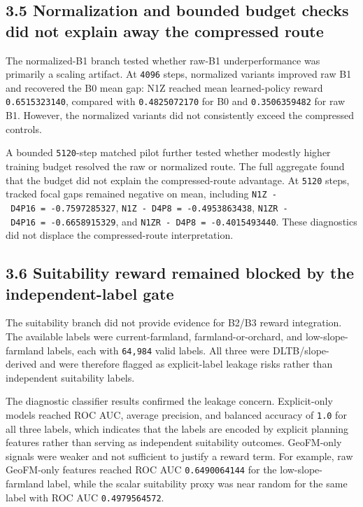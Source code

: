 \documentclass[
  11pt,
  a4paper,
]{article}
\begin{document}
\subsection{3.5 Normalization and bounded budget checks did not explain
away the compressed
route}\label{normalization-and-bounded-budget-checks-did-not-explain-away-the-compressed-route}

The normalized-B1 branch tested whether raw-B1 underperformance was
primarily a scaling artifact. At \texttt{4096} steps, normalized
variants improved raw B1 and recovered the B0 mean gap: N1Z reached mean
learned-policy reward \texttt{0.6515323140}, compared with
\texttt{0.4825072170} for B0 and \texttt{0.3506359482} for raw B1.
However, the normalized variants did not consistently exceed the
compressed controls.

A bounded \texttt{5120}-step matched pilot further tested whether
modestly higher training budget resolved the raw or normalized route.
The full aggregate found that the budget did not explain the
compressed-route advantage. At \texttt{5120} steps, tracked focal gaps
remained negative on mean, including
\texttt{N1Z\ -\ D4P16\ =\ -0.7597285327},
\texttt{N1Z\ -\ D4P8\ =\ -0.4953863438},
\texttt{N1ZR\ -\ D4P16\ =\ -0.6658915329}, and
\texttt{N1ZR\ -\ D4P8\ =\ -0.4015493440}. These diagnostics did not
displace the compressed-route interpretation.

\subsection{3.6 Suitability reward remained blocked by the
independent-label
gate}\label{suitability-reward-remained-blocked-by-the-independent-label-gate}

The suitability branch did not provide evidence for B2/B3 reward
integration. The available labels were current-farmland,
farmland-or-orchard, and low-slope-farmland labels, each with
\texttt{64,984} valid labels. All three were DLTB/slope-derived and were
therefore flagged as explicit-label leakage risks rather than
independent suitability labels.

The diagnostic classifier results confirmed the leakage concern.
Explicit-only models reached ROC AUC, average precision, and balanced
accuracy of \texttt{1.0} for all three labels, which indicates that the
labels are encoded by explicit planning features rather than serving as
independent suitability outcomes. GeoFM-only signals were weaker and not
sufficient to justify a reward term. For example, raw GeoFM-only
features reached ROC AUC \texttt{0.6490064144} for the
low-slope-farmland label, while the scalar suitability proxy was near
random for the same label with ROC AUC \texttt{0.4979564572}.
\end{document}

